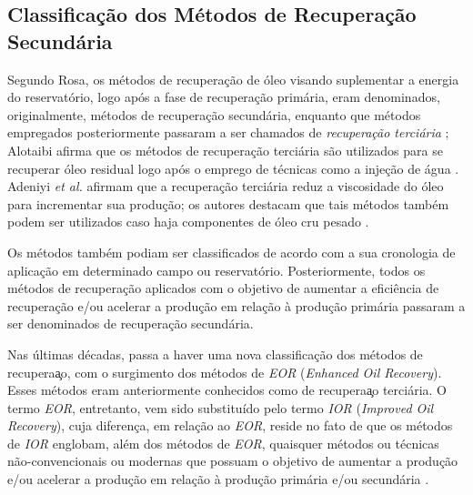 \subsection{Classifica\c{c}\~{a}o dos M\'{e}todos de Recupera\c{c}\~{a}o Secund\'{a}ria}
Segundo Rosa, os m\'{e}todos de recupera\c{c}\~{a}o de \'{o}leo visando suplementar a energia do reservat\'{o}rio, logo ap\'{o}s a fase de recupera\c{c}\~{a}o prim\'{a}ria, eram denominados, originalmente, m\'{e}todos de recupera\c{c}\~{a}o secund\'{a}ria, enquanto que m\'{e}todos empregados posteriormente passaram a ser chamados de \textit{recupera\c{c}\~{a}o terci\'{a}ria} \cite{engres}; Alotaibi afirma que os m\'{e}todos de recupera\c{c}\~{a}o terci\'{a}ria s\~{a}o utilizados para se recuperar \'{o}leo residual logo ap\'{o}s o emprego de t\'{e}cnicas como a inje\c{c}\~{a}o de \'{a}gua \cite{alotaibi}. Adeniyi \textit{et al.} afirmam que a recupera\c{c}\~{a}o terci\'{a}ria reduz a viscosidade do \'{o}leo para incrementar sua produ\c{c}\~{a}o; os autores destacam que tais m\'{e}todos tamb\'{e}m podem ser utilizados caso haja componentes de \'{o}leo cru pesado \cite{adeniyi2008}. 

Os m\'{e}todos tamb\'{e}m podiam ser classificados de acordo com a sua cronologia de aplica\c{c}\~{a}o em determinado campo ou reservat\'{o}rio. Posteriormente, todos os m\'{e}todos de recupera\c{c}\~{a}o aplicados com o objetivo de aumentar a efici\^{e}ncia de recupera\c{c}\~{a}o e/ou acelerar a produ\c{c}\~{a}o em rela\c{c}\~{a}o \`{a} produ\c{c}\~{a}o prim\'{a}ria passaram a ser denominados de recupera\c{c}\~{a}o secund\'{a}ria.

Nas \'{u}ltimas d\'{e}cadas, passa a haver uma nova classifica\c{c}\~{a}o dos m\'{e}todos de recupera\c{a}o, com o surgimento dos m\'{e}todos de \textit{EOR} (\textit{Enhanced Oil Recovery}). Esses m\'{e}todos eram anteriormente conhecidos como de recupera\c{a}o terci\'{a}ria. O termo \textit{EOR}, entretanto, vem sido substitu\'{i}do pelo termo \textit{IOR} (\textit{Improved Oil Recovery}), cuja diferen\c{c}a, em rela\c{c}\~{a}o ao \textit{EOR}, reside no fato de que os m\'{e}todos de \textit{IOR} englobam, al\'{e}m dos m\'{e}todos de \textit{EOR}, quaisquer m\'{e}todos ou t\'{e}cnicas n\~{a}o-convencionais ou modernas que possuam o objetivo de aumentar a produ\c{c}\~{a}o e/ou acelerar a produ\c{c}\~{a}o em rela\c{c}\~{a}o \`{a} produ\c{c}\~{a}o prim\'{a}ria e/ou secund\'{a}ria \cite[p. 564]{engres}. 


